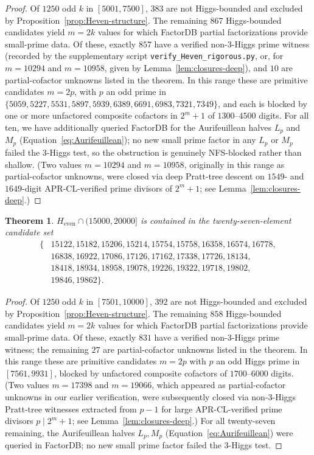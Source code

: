 \documentclass[11pt]{amsart}
\theoremstyle{plain}
\newtheorem{theorem}{Theorem}
\theoremstyle{definition}
\begin{document}
\begin{proof}
Of $1250$ odd $k$ in $[5001, 7500]$, $383$ are not Higgs-bounded
and excluded by Proposition~\ref{prop:Heven-structure}. The remaining
$867$ Higgs-bounded candidates yield $m = 2k$ values for which
FactorDB partial factorizations provide small-prime data. Of these,
exactly $857$
have a verified non-3-Higgs prime witness (recorded by the
supplementary script \texttt{verify\_Heven\_rigorous.py}, or, for
$m=10294$ and $m=10958$, given by Lemma~\ref{lem:closures-deep}), and $10$
are partial-cofactor unknowns listed in the theorem.  In this range
these are primitive candidates $m=2p$, with
$p$ an odd prime in $\{5059, 5227, 5531, 5897, 5939, 6389, 6691,
6983, 7321, 7349\}$, and each is blocked by one or more
unfactored composite cofactors in $2^m+1$ of $1300$--$4500$ digits.
For all ten, we have additionally queried FactorDB for the
Aurifeuillean halves $L_p$ and $M_p$ (Equation~\ref{eq:Aurifeuillean});
no new small prime factor in any $L_p$ or $M_p$ failed the 3-Higgs
test, so the obstruction is genuinely NFS-blocked rather than
shallow. (Two values $m = 10294$ and $m = 10958$, originally in this
range as partial-cofactor unknowns, were closed via deep Pratt-tree
descent on $1549$- and $1649$-digit APR-CL-verified prime divisors of
$2^m + 1$; see Lemma~\ref{lem:closures-deep}.)
\end{proof}

\begin{theorem}\label{thm:Heven-20000}
$H_{\mathrm{even}} \cap (15000, 20000]$ is contained in the
twenty-seven-element candidate set
\[
\begin{aligned}
\{ & 15122, 15182, 15206, 15214, 15754, 15758, 16358, 16574, 16778,\\
   & 16838, 16922, 17086, 17126, 17162, 17338, 17726, 18134,\\
   & 18418, 18934, 18958, 19078, 19226, 19322, 19718, 19802,\\
   & 19846, 19862 \}.
\end{aligned}
\]
\end{theorem}

\begin{proof}
Of $1250$ odd $k$ in $[7501, 10000]$, $392$ are not Higgs-bounded
and excluded by Proposition~\ref{prop:Heven-structure}. The remaining
$858$ Higgs-bounded candidates yield $m = 2k$ values for which
FactorDB partial factorizations provide small-prime data. Of these,
exactly $831$ have a verified non-3-Higgs prime witness; the
remaining $27$ are partial-cofactor unknowns listed in the theorem.
In this range these are primitive candidates $m=2p$ with $p$ an odd
Higgs prime in $[7561, 9931]$, blocked by unfactored composite
cofactors of $1700$--$6000$ digits. (Two values
$m = 17398$ and $m = 19066$, which appeared as partial-cofactor
unknowns in our earlier verification, were subsequently closed via
non-3-Higgs Pratt-tree witnesses extracted from $p-1$ for large
APR-CL-verified prime divisors $p \mid 2^m + 1$; see Lemma~\ref{lem:closures-deep}.)
For all twenty-seven remaining, the Aurifeuillean halves $L_p, M_p$
(Equation~\ref{eq:Aurifeuillean}) were queried in FactorDB; no
new small prime factor failed the 3-Higgs test.
\end{proof}
\end{document}
